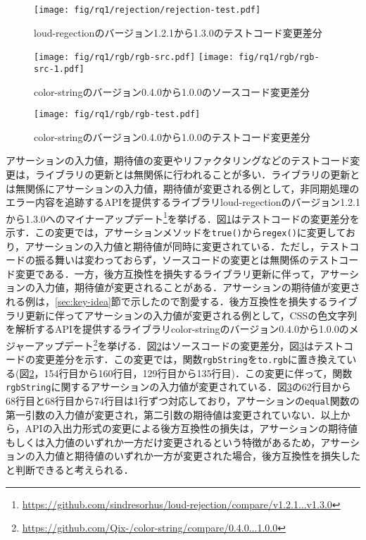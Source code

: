 \documentclass[submit]{ipsj}
\begin{document}
\begin{figure}[t]
  \centering
  \texttt{[image: fig/rq1/rejection/rejection-test.pdf]}
  \caption{loud-regectionのバージョン1.2.1から1.3.0のテストコード変更差分}
  \label{fig:rq1.change-test-rejection-test}
\end{figure}

\begin{figure}[t]
  \centering
  \texttt{[image: fig/rq1/rgb/rgb-src.pdf]}
  \texttt{[image: fig/rq1/rgb/rgb-src-1.pdf]}
  \caption{color-stringのバージョン0.4.0から1.0.0のソースコード変更差分}
  \label{fig:rq1.change-test-input-src}
\end{figure}

\begin{figure}[t]
  \centering
  \texttt{[image: fig/rq1/rgb/rgb-test.pdf]}
  \caption{color-stringのバージョン0.4.0から1.0.0のテストコード変更差分}
  \label{fig:rq1.change-test-input-test}
\end{figure}

アサーションの入力値，期待値の変更やリファクタリングなどのテストコード変更は，ライブラリの更新とは無関係に行われることが多い．ライブラリの更新とは無関係にアサーションの入力値，期待値が変更される例として，非同期処理のエラー内容を追跡するAPIを提供するライブラリloud-regectionのバージョン1.2.1から1.3.0へのマイナーアップデート\footnote{\url{https://github.com/sindresorhus/loud-rejection/compare/v1.2.1...v1.3.0}}を挙げる．図\ref{fig:rq1.change-test-rejection-test}はテストコードの変更差分を示す．この変更では，アサーションメソッドを{\verb|true()|}から{\verb|regex()|}に変更しており，アサーションの入力値と期待値が同時に変更されている．ただし，テストコードの振る舞いは変わっておらず，ソースコードの変更とは無関係のテストコード変更である．一方，後方互換性を損失するライブラリ更新に伴って，アサーションの入力値，期待値が変更されることがある．アサーションの期待値が変更される例は，\ref{sec:key-idea}節で示したので割愛する．後方互換性を損失するライブラリ更新に伴ってアサーションの入力値が変更される例として，CSSの色文字列を解析するAPIを提供するライブラリcolor-stringのバージョン0.4.0から1.0.0のメジャーアップデート\footnote{\url{https://github.com/Qix-/color-string/compare/0.4.0...1.0.0}}を挙げる．図\ref{fig:rq1.change-test-input-src}はソースコードの変更差分，図\ref{fig:rq1.change-test-input-test}はテストコードの変更差分を示す．この変更では，関数{\verb|rgbString|}を{\verb|to.rgb|}に置き換えている(図\ref{fig:rq1.change-test-input-src}，154行目から160行目，129行目から135行目)．この変更に伴って，関数{\verb|rgbString|}に関するアサーションの入力値が変更されている．図\ref{fig:rq1.change-test-input-test}の62行目から68行目と68行目から74行目は1行ずつ対応しており，アサーションの{\verb|equal|}関数の第一引数の入力値が変更され，第二引数の期待値は変更されていない．以上から，APIの入出力形式の変更による後方互換性の損失は，アサーションの期待値もしくは入力値のいずれか一方だけ変更されるという特徴があるため，アサーションの入力値と期待値のいずれか一方が変更された場合，後方互換性を損失したと判断できると考えられる．
\end{document}
